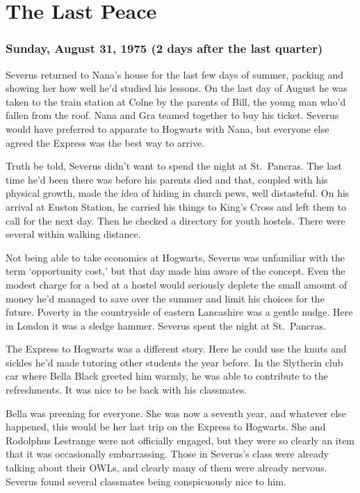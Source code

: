 
\chapter{The Last Peace}

\subsection{Sunday, August 31, 1975 (2 days after the last quarter)}

Severus returned to Nana's house for the last few days of summer, packing and showing her how well he'd studied his lessons. On the last day of August he was taken to the train station at Colne by the parents of Bill, the young man who'd fallen from the roof. Nana and Gra teamed together to buy his ticket. Severus would have preferred to apparate to Hogwarts with Nana, but everyone else agreed the Express was the best way to arrive.

Truth be told, Severus didn't want to spend the night at St.~Pancras. The last time he'd been there was before his parents died and that, coupled with his physical growth, made the idea of hiding in church pews, well{\el} distasteful. On his arrival at Euston Station, he carried his things to King's Cross and left them to call for the next day. Then he checked a directory for youth hostels. There were several within walking distance.

Not being able to take economics at Hogwarts, Severus was unfamiliar with the term `opportunity cost,' but that day made him aware of the concept. Even the modest charge for a bed at a hostel would seriously deplete the small amount of money he'd managed to save over the summer and limit his choices for the future. Poverty in the countryside of eastern Lancashire was a gentle nudge. Here in London it was a sledge hammer. Severus spent the night at St.~Pancras.

The Express to Hogwarts was a different story. Here he could use the knuts and sickles he'd made tutoring other students the year before. In the Slytherin club car where Bella Black greeted him warmly, he was able to contribute to the refreshments. It was nice to be back with his classmates.

Bella was preening for everyone. She was now a seventh year, and whatever else happened, this would be her last trip on the Express to Hogwarts. She and Rodolphus Lestrange were not officially engaged, but they were so clearly an item that it was occasionally embarrassing. Those in Severus's class were already talking about their OWLs, and clearly many of them were already nervous. Severus found several classmates being conspicuously nice to him.

